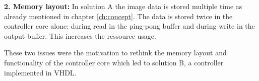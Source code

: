 
\vspace{1ex}
\textbf{2. Memory layout:} In solution A the image data is stored multiple time
as already mentioned in chapter \ref{ch:concept}. The data is stored twice in
the controller core alone: during read in the ping-pong buffer and during write
in the output buffer. This increases the ressource usage.

\vspace{1ex}
These two issues were the motivation to rethink the memory layout and
functionality of the controller core which led to solution B, a controller
implemented in VHDL.




\clearpage
